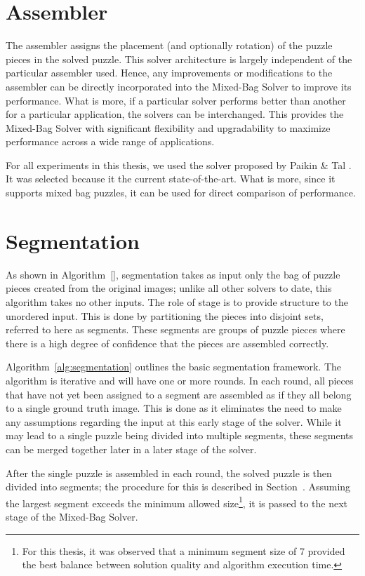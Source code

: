 \section{Assembler}\label{sec:SolverAssembler}

The assembler assigns the placement (and optionally rotation) of the puzzle pieces in the solved puzzle.  This solver architecture is largely independent of the particular assembler used.  Hence, any improvements or modifications to the assembler can be directly incorporated into the Mixed-Bag Solver to improve its performance.  What is more, if a particular solver performs better than another for a particular application, the solvers can be interchanged.  This provides the Mixed-Bag Solver with significant flexibility and upgradability to maximize performance across a wide range of applications.

For all experiments in this thesis, we used the solver proposed by Paikin \& Tal \cite{paikin2015}.  It was selected because it the current state-of-the-art.  What is more, since it supports mixed bag puzzles, it can be used for direct comparison of performance.

\section{Segmentation}\label{sec:Segmentation}

As shown in Algorithm~\ref{}, segmentation takes as input only the bag of puzzle pieces created from the original images; unlike all other solvers to date, this algorithm takes no other inputs.  The role of stage is to provide structure to the unordered input.  This is done by partitioning the pieces into disjoint sets, referred to here as segments.  These segments are groups of puzzle pieces where there is a high degree of confidence that the pieces are assembled correctly.

Algorithm~\ref{alg:segmentation} outlines the basic segmentation framework.  The algorithm is iterative and will have one or more rounds.  In each round, all pieces that have not yet been assigned to a segment are assembled as if they all belong to a single ground truth image.  This is done as it eliminates the need to make any assumptions regarding the input at this early stage of the solver.  While it may lead to a single puzzle being divided into multiple segments, these segments can be merged together later in a later stage of the solver.

After the single puzzle is assembled in each round, the solved puzzle is then divided into segments; the procedure for this is described in Section~\label{sec:segmentPuzzle}.  Assuming the largest segment exceeds the minimum allowed size\footnote{For this thesis, it was observed that a minimum segment size of 7 provided the best balance between solution quality and algorithm execution time.}, it is passed to the next stage of the Mixed-Bag Solver.  

